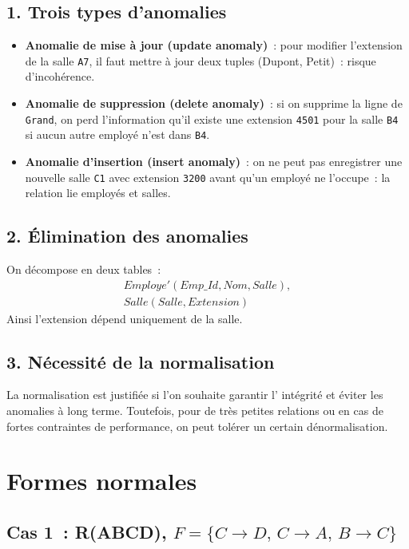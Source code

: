 \documentclass[a4paper,12pt]{article}
\begin{document}
\subsection*{1. Trois types d'anomalies}
\begin{itemize}
  \item \textbf{Anomalie de mise à jour (update anomaly)} : pour modifier l'extension de la salle \texttt{A7}, il faut mettre à jour deux tuples (Dupont, Petit) : risque d'incohérence.
  \item \textbf{Anomalie de suppression (delete anomaly)} : si on supprime la ligne de \texttt{Grand}, on perd l'information qu'il existe une extension \texttt{4501} pour la salle \texttt{B4} si aucun autre employé n'est dans \texttt{B4}.
  \item \textbf{Anomalie d'insertion (insert anomaly)} : on ne peut pas enregistrer une nouvelle salle \texttt{C1} avec extension \texttt{3200} avant qu'un employé ne l'occupe : la relation lie employés et salles.
\end{itemize}

\subsection*{2. Élimination des anomalies}
On décompose en deux tables :
\[
  \begin{aligned}
    Employe'(Emp\_Id, Nom, Salle),\\
    Salle(Salle, Extension)
  \end{aligned}
\]
Ainsi l'extension dépend uniquement de la salle.

\subsection*{3. Nécessité de la normalisation}
La normalisation est justifiée si l'on souhaite garantir l'
intégrité et éviter les anomalies à long terme. Toutefois, pour de très petites relations
ou en cas de fortes contraintes de performance,
on peut tolérer un certain dénormalisation.

\section*{Formes normales}

\subsection*{Cas 1 : R(ABCD), $F=\{C \to D,\,C \to A,\,B \to C\}$}
\end{document}
